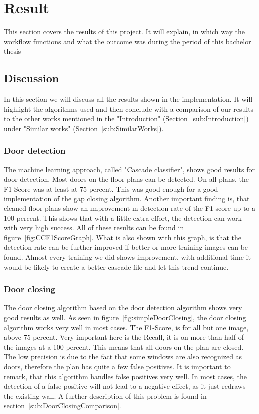 \section{Result}
This section covers the results of this project. It will explain, in which way the workflow functions and what the outcome was during the period of this bachelor thesis

\subsection{Discussion}
\label{sub:Discussion}
In this section we will discuss all the results shown in the implementation. It will highlight the algorithms used and then conclude with a comparison of our results to the other works mentioned in the "Introduction" (Section~\ref{sub:Introduction}) under "Similar works" (Section~\ref{sub:SimilarWorks}).

\subsubsection{Door detection}
The machine learning approach, called "Cascade classifier", shows good results for door detection. Most doors on the floor plans can be detected. On all plans, the F1-Score was at least at 75 percent. This was good enough for a good implementation of the gap closing algorithm. Another important finding is, that cleaned floor plans show an improvement in detection rate of the F1-score up to a 100 percent. This shows that with a little extra effort, the detection can work with very high success. All of these results can be found in figure~\ref{fig:CCF1ScoreGraph}. What is also shown with this graph, is that the detection rate can be further improved if better or more training images can be found. Almost every training we did shows improvement, with additional time it would be likely to create a better cascade file and let this trend continue.

\subsubsection{Door closing}
The door closing algorithm based on the door detection algorithm shows very good results as well. As seen in figure~\ref{fig:simpleDoorClosing}, the door closing algorithm works very well in most cases. The F1-Score, is for all but one image, above 75 percent. Very important here is the Recall, it is on more than half of the images at a 100 percent. This means that all doors on the plan are closed. The low precision is due to the fact that some windows are also recognized as doors, therefore the plan has quite a few false positives. It is important to remark, that this algorithm handles false positives very well. In most cases, the detection of a false positive will not lead to a negative effect, as it just redraws the existing wall. A further description of this problem is found in section~\ref{sub:DoorClosingComparison}.

